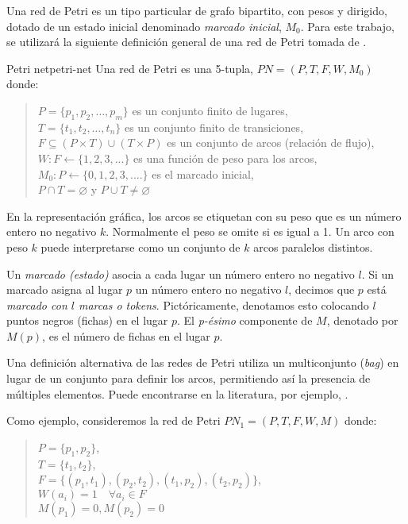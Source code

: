 Una red de Petri es un tipo particular de grafo bipartito, con pesos y dirigido, dotado de un
estado inicial denominado \emph{marcado inicial}, $M_0$.
Para este trabajo, se utilizará la siguiente
definición general de una red de Petri tomada de \cite{murata1989}.

\begin{definition}{Petri net}{petri-net}
      Una red de Petri es una 5-tupla, $ PN = (P, T, F, W, M_{0}) $ donde:

      \begin{quote}
            $ P = \{ p_1, p_2, \dots, p_m \} $ es un conjunto finito de lugares,\\
            $ T = \{ t_1, t_2, \dots, t_n \} $ es un conjunto finito de transiciones,\\
            $ F \subseteq (P \times T) \cup (T \times P) $ es un conjunto de arcos (relación de flujo),\\
            $ W: F \leftarrow \{1, 2, 3, ... \} $ es una función de peso para los arcos,\\
            $ M_{0}: P \leftarrow \{0, 1, 2, 3, .... \} $ es el marcado inicial,\\
            $ P \cap T = \varnothing $ y $ P \cup T \neq \varnothing $
      \end{quote}
\end{definition}

En la representación gráfica, los arcos se etiquetan con su peso que es un número entero no
negativo $k$. Normalmente el peso se omite si es igual a 1. Un arco con peso $k$ puede
interpretarse como un conjunto de $k$ arcos paralelos distintos.

Un \emph{marcado (estado)} asocia a cada lugar un número entero no negativo $l$.
Si un marcado asigna al lugar $p$ un número entero no negativo $l$,
decimos que $p$ está \emph{marcado con $l$ marcas o tokens}.
Pictóricamente, denotamos esto colocando $l$ puntos negros (fichas) en el lugar $p$.
El \emph{p-ésimo} componente de $M$, denotado por $M(p)$, es el número de fichas en el lugar $p$.

Una definición alternativa de las redes de Petri utiliza un multiconjunto (\emph{bag}) en lugar de un conjunto para
definir los arcos, permitiendo así la presencia de múltiples elementos. Puede encontrarse en la
literatura, por ejemplo, \cite[Definition 2.3]{peterson1981}.

Como ejemplo, consideremos la red de Petri $ PN_{1} = (P, T, F, W, M) $ donde:

\begin{quote}
      $ P = \{ p_1, p_2 \} $,\\
      $ T = \{ t_1, t_2 \} $,\\
      $ F = \{ (p_1, t_1), (p_2, t_2), (t_1, p_2), (t_2, p_2) \} $,\\
      $ W(a_i) = 1 \quad \forall a_i \in F $\\
      $ M(p_1) = 0, M(p_2) = 0 $
\end{quote}

